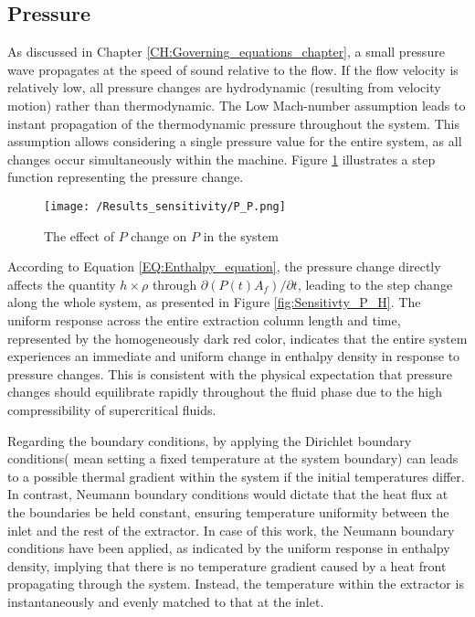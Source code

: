 \documentclass[../Article_Sensitivity_Analsysis.tex]{subfiles}
\begin{document}
    \subsection{Pressure}
    
    As discussed in Chapter \ref{CH:Governing_equations_chapter}, a small pressure wave propagates at the speed of sound relative to the flow. If the flow velocity is relatively low, all pressure changes are hydrodynamic (resulting from velocity motion) rather than thermodynamic. The Low Mach-number assumption leads to instant propagation of the thermodynamic pressure throughout the system. This assumption allows considering a single pressure value for the entire system, as all changes occur simultaneously within the machine. Figure \ref{fig:Sensitivty_P_P} illustrates a step function representing the pressure change.
    
    \begin{figure}[h!]
    	\centering
    	\texttt{[image: /Results\_sensitivity/P\_P.png]}
    	\caption{The effect of $P$ change on $P$ in the system}
    	\label{fig:Sensitivty_P_P}
    \end{figure}
    
    According to Equation \ref{EQ:Enthalpy_equation}, the pressure change directly affects the quantity $h \times \rho$ through $\partial (P(t) A_f) / \partial t$, leading to the step change along the whole system, as presented in Figure \ref{fig:Sensitivty_P_H}. The uniform response across the entire extraction column length and time, represented by the homogeneously dark red color, indicates that the entire system experiences an immediate and uniform change in enthalpy density in response to pressure changes. This is consistent with the physical expectation that pressure changes should equilibrate rapidly throughout the fluid phase due to the high compressibility of supercritical fluids.
    
    Regarding the boundary conditions, by applying the Dirichlet boundary conditions( mean setting a fixed temperature at the system boundary) can leads to a possible thermal gradient within the system if the initial temperatures differ. In contrast, Neumann boundary conditions would dictate that the heat flux at the boundaries be held constant, ensuring temperature uniformity between the inlet and the rest of the extractor. In case of this work, the Neumann boundary conditions have been applied, as indicated by the uniform response in enthalpy density, implying that there is no temperature gradient caused by a heat front propagating through the system. Instead, the temperature within the extractor is instantaneously and evenly matched to that at the inlet.
    
\end{document}
